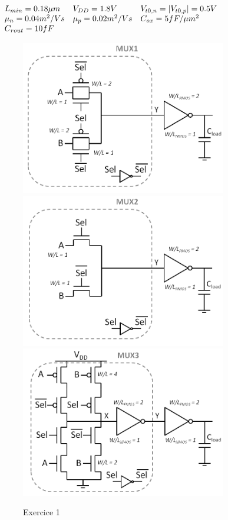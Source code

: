 \begin{center}
$
	\begin{array}{l l l}
		L_{min} = 0.18 \mu m 	& V_{DD} = 1.8 V 		& V_{t0,n} = |V_{t0,p} | = 0.5 V \\
		\mu_n = 0.04 m^2/Vs 	& \mu_p = 0.02 m^2/Vs	& C_{ox} = 5 fF/\mu m^2 \\
		C_{rout} = 10fF			&						& \\
	\end{array}
$
\end{center}

\begin{figure}[!htbp]
   \centering
   \includegraphics[width=9cm]{figure/fig7-3-1.png}
	 \includegraphics[width=9cm]{figure/fig7-3-2.png}
	 \includegraphics[width=9cm]{figure/fig7-3-3.png}
   \caption{Exercice 1}
   \label{fig7-3}
\end{figure}

